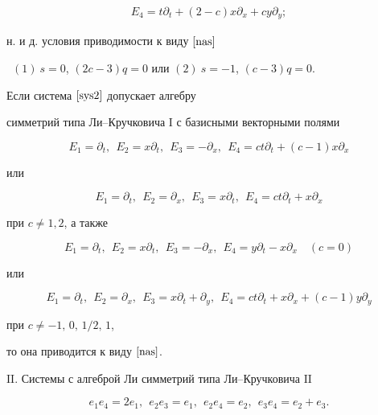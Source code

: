 \begin{thms}
\begin{gather*}
E_4=t\partial_t+(2-c)x\partial_x+cy\partial_y;


\end{gather*}


н. и д. условия приводимости к виду $\eqref{nas}$


\ $(1)\ s=0$, $(2c-3)q=0$ или $(2) \ s=-1$, $(c-3)q=0$.





Если система $\eqref{sys2}$ допускает алгебру


симметрий типа Ли--Кручковича $\mathrm I$ с базисными векторными полями


$$


E_1=\partial_t,\ \ E_2=x\partial_ t,\ \ E_3=-\partial_ x,\ \


E_4=ct\partial_t+(c-1)x\partial_x


$$


или


$$


E_1=\partial_t,\ \ E_2=\partial_ x,\ \ E_3=x\partial_ t,


\ \ E_4=ct\partial_t+x\partial_x


$$


при $c\neq 1,2$, а также


$$


E_1=\partial_t,\ \ E_2=x\partial_t,\ \ E_3=-\partial_x,


\ \ E_4=y\partial_t-x\partial_x\quad (c=0)


$$


или 


$$


E_1=\partial_t,\ \ E_2=\partial_x,\ \ E_3=x\partial_t+\partial_y,


\ \ E_4=ct\partial_t+x\partial_x+(c-1)y\partial_y


$$


при $c\neq -1,\,0,\,1/2,\, 1$,


то она приводится к виду $\eqref{nas}$.








$\mathrm{II}$. Системы с алгеброй Ли симметрий типа Ли--Кручковича $\mathrm{II}$


$$


e_1e_4=2e_1,\ \ e_2e_3=e_1,\ \ e_2e_4=e_2,\ \ e_3e_4=e_2+e_3.


$$









\end{thms}
